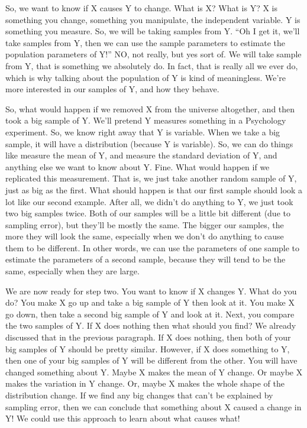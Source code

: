 \documentclass[
]{book}
\begin{document}
So, we want to know if X causes Y to change. What is X? What is Y? X is something you change, something you manipulate, the independent variable. Y is something you measure. So, we will be taking samples from Y. ``Oh I get it, we'll take samples from Y, then we can use the sample parameters to estimate the population parameters of Y!'' NO, not really, but yes sort of. We will take sample from Y, that is something we absolutely do. In fact, that is really all we ever do, which is why talking about the population of Y is kind of meaningless. We're more interested in our samples of Y, and how they behave.

So, what would happen if we removed X from the universe altogether, and then took a big sample of Y. We'll pretend Y measures something in a Psychology experiment. So, we know right away that Y is variable. When we take a big sample, it will have a distribution (because Y is variable). So, we can do things like measure the mean of Y, and measure the standard deviation of Y, and anything else we want to know about Y. Fine. What would happen if we replicated this measurement. That is, we just take another random sample of Y, just as big as the first. What should happen is that our first sample should look a lot like our second example. After all, we didn't do anything to Y, we just took two big samples twice. Both of our samples will be a little bit different (due to sampling error), but they'll be mostly the same. The bigger our samples, the more they will look the same, especially when we don't do anything to cause them to be different. In other words, we can use the parameters of one sample to estimate the parameters of a second sample, because they will tend to be the same, especially when they are large.

We are now ready for step two. You want to know if X changes Y. What do you do? You make X go up and take a big sample of Y then look at it. You make X go down, then take a second big sample of Y and look at it. Next, you compare the two samples of Y. If X does nothing then what should you find? We already discussed that in the previous paragraph. If X does nothing, then both of your big samples of Y should be pretty similar. However, if X does something to Y, then one of your big samples of Y will be different from the other. You will have changed something about Y. Maybe X makes the mean of Y change. Or maybe X makes the variation in Y change. Or, maybe X makes the whole shape of the distribution change. If we find any big changes that can't be explained by sampling error, then we can conclude that something about X caused a change in Y! We could use this approach to learn about what causes what!
\end{document}
